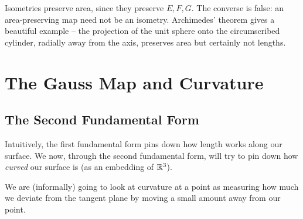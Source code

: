 \documentclass[a4paper]{scrartcl}
\begin{document}
\begin{remark}
    Isometries preserve area, since they preserve $E, F, G$. The converse is false: an area-preserving map need not be an isometry. Archimedes' theorem gives a beautiful example -- the projection of the unit sphere onto the circumscribed cylinder, radially away from the axis, preserves area but certainly not lengths.
\end{remark}

\section{The Gauss Map and Curvature}

\subsection{The Second Fundamental Form}


Intuitively, the first fundamental form pins down how length works along our surface. We now, through the second fundamental form, will try to pin down how \emph{curved} our surface is (as an embedding of $\mathbb{R}^3$).

We are (informally) going to look at curvature at a point as measuring how much we deviate from the tangent plane by moving a small amount away from our point.
\end{document}
